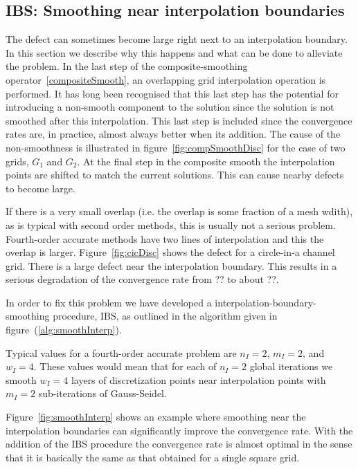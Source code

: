 \documentclass{article}
\begin{document}
\subsection{IBS: Smoothing near interpolation boundaries}

  The defect can sometimes become large right next to an interpolation boundary. In this section 
we describe why this happens and what can be done to alleviate the problem.
In the last step of the composite-smoothing operator~\ref{compositeSmooth}, an overlapping grid
interpolation operation is performed. It has long been recognised that this last step has the potential
for introducing a non-smooth component to the solution since the solution is not smoothed after
this interpolation. This last step is included since the convergence rates are, in practice,
almost always better when its addition.
The cause of the non-smoothness is illustrated in figure~\ref{fig:compSmoothDisc} for the case
of two grids, $G_1$ and $G_2$. At the final step in the composite smooth the interpolation points
are shifted to match the current solutions. This can cause nearby defects to become large.

If there is a very small overlap (i.e. the overlap is some fraction of a mesh wdith), 
as is typical with second order methods, this is usually not a serious problem. Fourth-order accurate methods
have two lines of interpolation and this the overlap is larger. Figure~\ref{fig:cicDisc} shows the defect for
a circle-in-a channel grid. There is a large defect near the interpolation boundary. This results in 
a serious degradation of the convergence rate from ?? to about ??.

In order to fix this problem we have developed a interpolation-boundary-smoothing procedure, IBS,  as outlined in the
algorithm given in figure~(\ref{alg:smoothInterp}).


Typical values for a fourth-order accurate problem are $n_I=2$, $m_I=2$, and $w_I=4$. 
These values would mean that for each of $n_I=2$ global iterations we
smooth $w_I=4$ layers of discretization points near interpolation points with $m_I=2$ sub-iterations of Gauss-Seidel.

Figure~\ref{fig:smoothInterp} shows an example where smoothing near the interpolation boundaries
can significantly improve the convergence rate. With the addition of the IBS procedure the convergence rate
is almost optimal in the sense that it is basically the same as that obtained for a single square grid.
\end{document}
